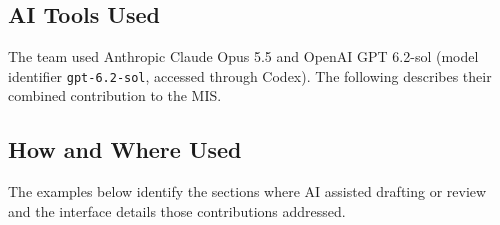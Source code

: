 \documentclass[12pt, titlepage]{article}
\begin{document}
\subsection{AI Tools Used}

The team used Anthropic Claude Opus 5.5 and OpenAI GPT 6.2-sol
(model identifier \texttt{gpt-6.2-sol}, accessed through Codex).
The following describes their combined contribution to the MIS.

\subsection{How and Where Used}

The examples below identify the sections where AI assisted drafting or
review and the interface details those contributions addressed.
\end{document}
